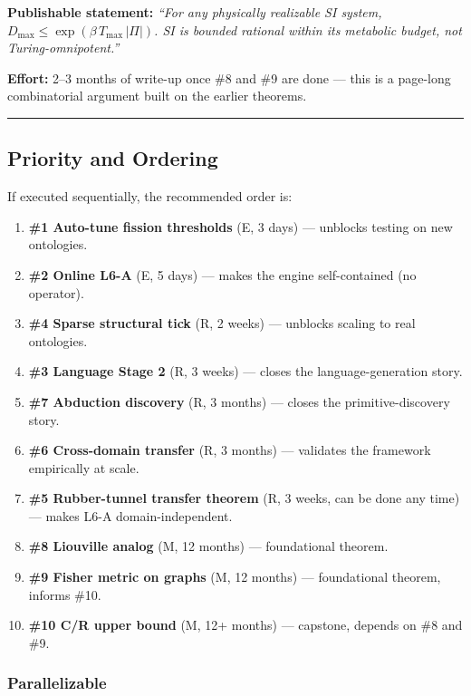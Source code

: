 \documentclass[
  11pt,
  a4paper,
]{article}
\providecommand{\tightlist}{%
  \setlength{\itemsep}{0pt}\setlength{\parskip}{0pt}}
\begin{document}
\textbf{Publishable statement:} \emph{``For any physically realizable SI
system, \(D_\text{max} \leq \exp(\beta \, T_\text{max} \, |\Pi|)\). SI
is bounded rational within its metabolic budget, not
Turing-omnipotent.''}

\textbf{Effort:} 2--3 months of write-up once \#8 and \#9 are done ---
this is a page-long combinatorial argument built on the earlier
theorems.

\begin{center}\rule{0.5\linewidth}{0.5pt}\end{center}

\subsection{Priority and Ordering}\label{priority-and-ordering}

If executed sequentially, the recommended order is:

\begin{enumerate}
\def\labelenumi{\arabic{enumi}.}
\tightlist
\item
  \textbf{\#1 Auto-tune fission thresholds} (E, 3 days) --- unblocks
  testing on new ontologies.
\item
  \textbf{\#2 Online L6-A} (E, 5 days) --- makes the engine
  self-contained (no operator).
\item
  \textbf{\#4 Sparse structural tick} (R, 2 weeks) --- unblocks scaling
  to real ontologies.
\item
  \textbf{\#3 Language Stage 2} (R, 3 weeks) --- closes the
  language-generation story.
\item
  \textbf{\#7 Abduction discovery} (R, 3 months) --- closes the
  primitive-discovery story.
\item
  \textbf{\#6 Cross-domain transfer} (R, 3 months) --- validates the
  framework empirically at scale.
\item
  \textbf{\#5 Rubber-tunnel transfer theorem} (R, 3 weeks, can be done
  any time) --- makes L6-A domain-independent.
\item
  \textbf{\#8 Liouville analog} (M, 12 months) --- foundational theorem.
\item
  \textbf{\#9 Fisher metric on graphs} (M, 12 months) --- foundational
  theorem, informs \#10.
\item
  \textbf{\#10 C/R upper bound} (M, 12+ months) --- capstone, depends on
  \#8 and \#9.
\end{enumerate}

\subsubsection{Parallelizable}\label{parallelizable}
\end{document}
